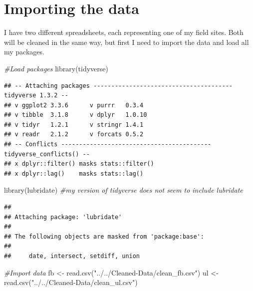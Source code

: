 \documentclass[
]{book}
\newenvironment{Shaded}{\begin{snugshade}}{\end{snugshade}}
\newcommand{\CommentTok}[1]{\textcolor[rgb]{0.56,0.35,0.01}{\textit{#1}}}
\newcommand{\FunctionTok}[1]{\textcolor[rgb]{0.00,0.00,0.00}{#1}}
\newcommand{\NormalTok}[1]{#1}
\newcommand{\OtherTok}[1]{\textcolor[rgb]{0.56,0.35,0.01}{#1}}
\newcommand{\StringTok}[1]{\textcolor[rgb]{0.31,0.60,0.02}{#1}}
\begin{document}
\hypertarget{importing-the-data}{%
\section{Importing the data}\label{importing-the-data}}

I have two different spreadsheets, each representing one of my field sites. Both will be cleaned in the same way, but first I need to import the data and load all my packages.

\begin{Shaded}
\begin{Highlighting}[]
\CommentTok{\#Load packages}
\FunctionTok{library}\NormalTok{(tidyverse)}
\end{Highlighting}
\end{Shaded}

\begin{verbatim}
## -- Attaching packages --------------------------------------- tidyverse 1.3.2 --
## v ggplot2 3.3.6      v purrr   0.3.4 
## v tibble  3.1.8      v dplyr   1.0.10
## v tidyr   1.2.1      v stringr 1.4.1 
## v readr   2.1.2      v forcats 0.5.2 
## -- Conflicts ------------------------------------------ tidyverse_conflicts() --
## x dplyr::filter() masks stats::filter()
## x dplyr::lag()    masks stats::lag()
\end{verbatim}

\begin{Shaded}
\begin{Highlighting}[]
\FunctionTok{library}\NormalTok{(lubridate) }\CommentTok{\#my version of tidyverse does not seem to include lubridate}
\end{Highlighting}
\end{Shaded}

\begin{verbatim}
## 
## Attaching package: 'lubridate'
## 
## The following objects are masked from 'package:base':
## 
##     date, intersect, setdiff, union
\end{verbatim}

\begin{Shaded}
\begin{Highlighting}[]
\CommentTok{\#Import data}
\NormalTok{fb }\OtherTok{\textless{}{-}} \FunctionTok{read.csv}\NormalTok{(}\StringTok{"../../Cleaned{-}Data/clean\_fb.csv"}\NormalTok{)}
\NormalTok{ul }\OtherTok{\textless{}{-}} \FunctionTok{read.csv}\NormalTok{(}\StringTok{"../../Cleaned{-}Data/clean\_ul.csv"}\NormalTok{)}
\end{Highlighting}
\end{Shaded}
\end{document}
